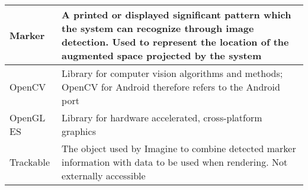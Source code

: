 \begin{tabulary}{\textwidth}{L|L}
    Marker            & A printed or displayed significant pattern which the system can recognize through image detection. Used to represent the location of the augmented space projected by the system       \\ \hline
    OpenCV            & Library for computer vision algorithms and methods; OpenCV for Android therefore refers to the Android port                                                                            \\ \hline
    OpenGL ES         & Library for hardware accelerated, cross-platform graphics                                                                                                                              \\ \hline
    Trackable         & The object used by Imagine to combine detected marker information with data to be used when rendering. Not externally accessible                                                       \\
\end{tabulary}
